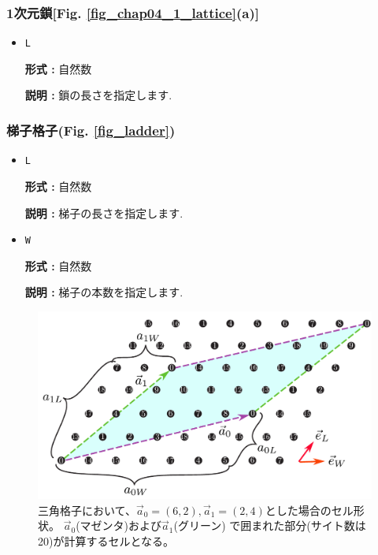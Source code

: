 \subsubsection{1次元鎖[Fig. \ref{fig_chap04_1_lattice}(a)]}

\begin{itemize}

\item \verb|L|

{\bf 形式 :} 自然数

{\bf 説明 :} 鎖の長さを指定します. 

\end{itemize}

\subsubsection{梯子格子(Fig. \ref{fig_ladder})}

\begin{itemize}

\item \verb|L|

{\bf 形式 :} 自然数

{\bf 説明 :} 梯子の長さを指定します. 

\item \verb|W|

{\bf 形式 :} 自然数

{\bf 説明 :} 梯子の本数を指定します. 

\end{itemize}

\begin{figure}[!htbp]
  \begin{center}
    \includegraphics[width=15cm]{../figs/chap04_1_unitlattice.pdf}
    \caption{三角格子において、${\vec a}_0 = (6, 2), {\vec a}_1 = (2, 4)$とした場合のセル形状。
      ${\vec a}_0$(マゼンタ)および${\vec a}_1$(グリーン)
      で囲まれた部分(サイト数は20)が計算するセルとなる。
    }
    \label{fig_chap04_1_unitlattice}
  \end{center}
\end{figure}


